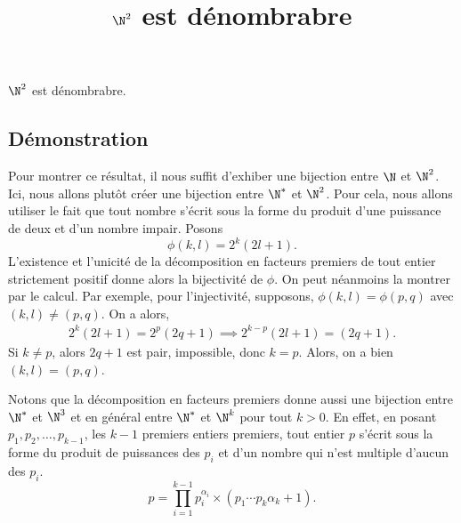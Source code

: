 \documentclass[fontsize=12pt,twoside=false,parskip=half, french]{scrartcl}
\title{$\N^2$ est dénombrabre}
\date{}
\author{}
\begin{document}
\maketitle
   \begin{Theoreme}
      $\N^2$ est dénombrabre.
   \end{Theoreme}
   \subsection{Démonstration}
      Pour montrer ce résultat, il nous suffit d’exhiber une bijection entre $\N$ et $\N^2$. Ici, nous 
      allons plutôt créer une bijection entre $\N^*$ et $\N^2$. Pour cela, nous allons utiliser le fait
      que tout nombre s’écrit sous la forme du produit d’une puissance de deux et d’un nombre impair. Posons 
      \[
         \phi(k, l) = 2^k(2l + 1).
      \]
      L’existence et l’unicité de la décomposition en facteurs premiers de tout entier strictement positif
      donne alors la bijectivité de $\phi$. On peut néanmoins la montrer par le calcul. Par exemple, pour
      l’injectivité, supposons, $\phi(k, l) = \phi(p, q)$ avec $(k, l) \neq (p, q)$. On a alors, 
      \begin{align*}
         2^k(2l + 1) = 2^p(2q + 1) \implies 2^{k - p}(2l + 1) = (2q + 1).
      \end{align*}
      Si $k \neq p$, alors $2q + 1$ est pair, impossible, donc $k = p$. Alors, on a bien $(k, l) = (p, q)$. 

      Notons que la décomposition en facteurs premiers donne aussi une bijection entre $\N^*$ et $\N^3$ et 
      en général entre $\N^*$ et $\N^k$ pour tout $k > 0$. En effet, en posant $p_1,p_2, \ldots, p_{k - 1}$, les $k - 1$
      premiers entiers premiers, tout entier $p$ s’écrit sous la forme du produit de puissances des $p_i$ et d’un 
      nombre qui n’est multiple d’aucun des $p_i$.
      \[
         p = \prod_{i = 1}^{k - 1} p_i^{\alpha_i} \times (p_1\cdots p_k \alpha_k + 1).
      \]
\end{document}

